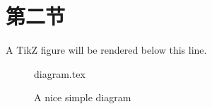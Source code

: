 \documentclass[float=false, crop=false]{standalone}
\begin{document}
    
    \section{第二节}
    A TikZ figure will be rendered below this line.
    \begin{figure}[ht]
        \centering
        {diagram.tex}
        \label{fig:tikzexample}
        \caption{A nice simple diagram}
    \end{figure}

\IfStandalone{   }{   }  %
\end{document}
